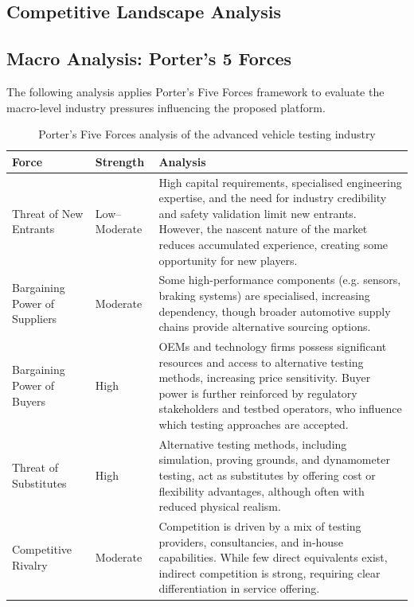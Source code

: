 \documentclass[11pt, a4paper]{report}
\numberwithin{equation}{section}
\begin{document}
\begin{refsection}
\section{Competitive Landscape Analysis}
\label{sec:competitive_landscape}

\subsection{Macro Analysis: Porter's 5 Forces}

The following analysis applies Porter’s Five Forces framework to evaluate the macro-level industry pressures influencing the proposed platform.

\begin{table}[h]
\centering
\caption{Porter’s Five Forces analysis of the advanced vehicle testing industry}
\footnotesize
\singlespacing
\begin{tabularx}{\textwidth}{|p{3.5cm}|p{1.7cm}|X|}
\hline
\textbf{Force} & \textbf{Strength} & \textbf{Analysis} \\
\hline
Threat of New Entrants & Low--Moderate & High capital requirements, specialised engineering expertise, and the need for industry credibility and safety validation limit new entrants. However, the nascent nature of the market reduces accumulated experience, creating some opportunity for new players. \\
\hline
Bargaining Power of Suppliers & Moderate & Some high-performance components (e.g. sensors, braking systems) are specialised, increasing dependency, though broader automotive supply chains provide alternative sourcing options. \\
\hline
Bargaining Power of Buyers & High & OEMs and technology firms possess significant resources and access to alternative testing methods, increasing price sensitivity. Buyer power is further reinforced by regulatory stakeholders and testbed operators, who influence which testing approaches are accepted. \\
\hline
Threat of Substitutes & High & Alternative testing methods, including simulation, proving grounds, and dynamometer testing, act as substitutes by offering cost or flexibility advantages, although often with reduced physical realism. \\
\hline
Competitive Rivalry & Moderate & Competition is driven by a mix of testing providers, consultancies, and in-house capabilities. While few direct equivalents exist, indirect competition is strong, requiring clear differentiation in service offering. \\
\hline
\end{tabularx}
\end{table}


\end{refsection}
\end{document}
